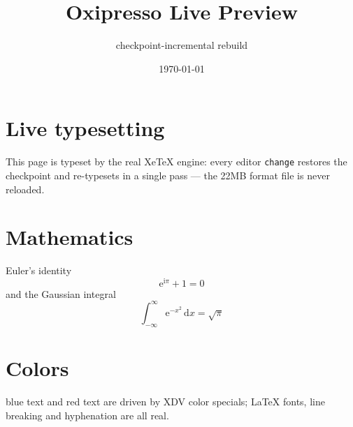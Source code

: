 \documentclass[12pt]{article}
\title{Oxipresso Live Preview}
\author{checkpoint-incremental rebuild}
\date{\today}
\begin{document}
\maketitle
\section{Live typesetting}
This page is typeset by the real XeTeX engine: every editor \texttt{change}
restores the checkpoint and re-typesets in a single pass --- the 22MB
format file is never reloaded.
\section{Mathematics}
Euler's identity
\begin{equation}
  \mathrm{e}^{\mathrm{i}\pi} + 1 = 0
\end{equation}
and the Gaussian integral
\begin{equation}
  \int_{-\infty}^{\infty} \mathrm{e}^{-x^2}\,\mathrm{d}x = \sqrt{\pi}
\end{equation}
\section{Colors}
{\color{blue} blue text} and {\color{red} red text} are driven by XDV color
specials; \LaTeX{} fonts, line breaking and hyphenation are all real.
\end{document}
